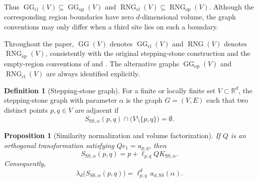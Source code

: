 \documentclass[a4paper,fleqn]{cas-dc}
\newtheorem{proposition}{Proposition}
\theoremstyle{definition}
\newtheorem{definition}{Definition}
\theoremstyle{remark}
\newcommand{\R}{\mathds{R}}
\newcommand{\ellpq}{\ell_{p,q}}
\newcommand{\upq}{u_{p,q}}
\newcommand{\0}{\mathbf{0}}
\newcommand{\tb}[1]{\textcolor[HTML]{0000bb}{#1}}
\DeclareMathOperator{\RNG}{RNG}
\DeclareMathOperator{\GG}{GG}
\begin{document}



Thus $\GG_{\mathrm{cl}}(V)\subseteq\GG_{\mathrm{op}}(V)$ and
$\RNG_{\mathrm{cl}}(V)\subseteq\RNG_{\mathrm{op}}(V)$. Although the
corresponding region boundaries have zero $d$-dimensional volume, the graph
conventions may only differ when a third site lies on such a boundary.

Throughout the paper, $\GG(V)$ denotes $\GG_{\mathrm{cl}}(V)$ and
$\RNG(V)$ denotes $\RNG_{\mathrm{op}}(V)$, consistently with the original
stepping-stone construction and the empty-region conventions of
\citet{kannangara2018stepping} and \citet{cardinal2009empty}. The alternative graphs
$\GG_{\mathrm{op}}(V)$ and $\RNG_{\mathrm{cl}}(V)$ are always identified
explicitly.


\begin{definition}[Stepping-stone graph]
For a finite or locally finite set $V\subset\R^d$, the stepping-stone
graph with parameter $\alpha$ is the graph $G=(V,E)$ such that two distinct points
$p,q\in V$ are adjacent if
\begin{equation}
    S_{\mathrm{SS},\alpha}(p,q)
    \cap
    \bigl(V\setminus\{p,q\}\bigr)
    =
    \emptyset.
\end{equation}
\end{definition}

\begin{proposition}[Similarity normalization and volume factorization]
\label{prop:factorization}
If $Q$ is an orthogonal transformation satisfying $Qe_1=\upq$, then
\begin{equation}\label{eq:similarity-normalization}
    S_{\mathrm{SS},\alpha}(p,q)
    =
    p+\ellpq QK_{\mathrm{SS},\alpha}.
\end{equation}
Consequently,
\begin{equation}\label{eq:volume-factorization}
    \lambda_d\bigl(S_{\mathrm{SS},\alpha}(p,q)\bigr)
    =
    \ellpq^d\,a_{d,\mathrm{SS}}(\alpha).
\end{equation}
\end{proposition}
\end{document}
